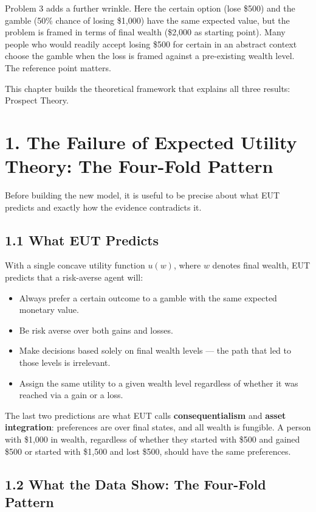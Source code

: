 \documentclass[12pt, letterpaper]{article}
\begin{document}
Problem 3 adds a further wrinkle. Here the certain option (lose \$500) and the gamble (50\% chance of losing \$1,000) have the same expected value, but the problem is framed in terms of final wealth (\$2,000 as starting point). Many people who would readily accept losing \$500 for certain in an abstract context choose the gamble when the loss is framed against a pre-existing wealth level. The reference point matters.

This chapter builds the theoretical framework that explains all three results: Prospect Theory.

\medskip


\section{1. The Failure of Expected Utility Theory: The Four-Fold Pattern}


Before building the new model, it is useful to be precise about what EUT predicts and exactly how the evidence contradicts it.


\subsection{1.1 What EUT Predicts}


With a single concave utility function $u(w)$, where $w$ denotes final wealth, EUT predicts that a risk-averse agent will:
\begin{itemize}
\item Always prefer a certain outcome to a gamble with the same expected monetary value.
\item Be risk averse over both gains and losses.
\item Make decisions based solely on final wealth levels --- the path that led to those levels is irrelevant.
\item Assign the same utility to a given wealth level regardless of whether it was reached via a gain or a loss.
\end{itemize}

The last two predictions are what EUT calls \textbf{consequentialism} and \textbf{asset integration}: preferences are over final states, and all wealth is fungible. A person with \$1,000 in wealth, regardless of whether they started with \$500 and gained \$500 or started with \$1,500 and lost \$500, should have the same preferences.


\subsection{1.2 What the Data Show: The Four-Fold Pattern}
\end{document}
